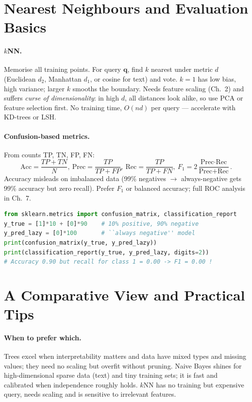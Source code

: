 \section{Nearest Neighbours and Evaluation Basics}
\label{sec:knn-eval}
\paragraph{$k$NN.} Memorise all training points. For query $\mathbf{q}$, find $k$ nearest under metric $d$ (Euclidean $d_2$, Manhattan $d_1$, or cosine for text) and vote. $k=1$ has low bias, high variance; larger $k$ smooths the boundary. Needs feature scaling (Ch.~2) and suffers \emph{curse of dimensionality}: in high $d$, all distances look alike, so use PCA or feature selection first. No training time, $O(nd)$ per query --- accelerate with KD-trees or LSH.

\paragraph{Confusion-based metrics.} From counts TP, TN, FP, FN:
\begin{equation}
\text{Acc}=\frac{TP+TN}{N},\ 
\text{Prec}=\frac{TP}{TP+FP},\ 
\text{Rec}=\frac{TP}{TP+FN},\ 
F_1=2\frac{\text{Prec}\cdot\text{Rec}}{\text{Prec}+\text{Rec}}.
\end{equation}
Accuracy misleads on imbalanced data (99\% negatives $\to$ always-negative gets 99\% accuracy but zero recall). Prefer $F_1$ or balanced accuracy; full ROC analysis in Ch.~7.

\begin{lstlisting}[language=Python, caption={Confusion matrix and the accuracy trap on imbalanced data.}, label={lst:metrics}]
from sklearn.metrics import confusion_matrix, classification_report
y_true = [1]*10 + [0]*90    # 10% positive, 90% negative
y_pred_lazy = [0]*100       # ``always negative'' model
print(confusion_matrix(y_true, y_pred_lazy))
print(classification_report(y_true, y_pred_lazy, digits=2))
# Accuracy 0.90 but recall for class 1 = 0.00 -> F1 = 0.00 !
\end{lstlisting}

\section{A Comparative View and Practical Tips}
\label{sec:compare-classifiers}
\paragraph{When to prefer which.} Trees excel when interpretability matters and data have mixed types and missing values; they need no scaling but overfit without pruning. Naive Bayes shines for high-dimensional sparse data (text) and tiny training sets; it is fast and calibrated when independence roughly holds. $k$NN has no training but expensive query, needs scaling and is sensitive to irrelevant features.

